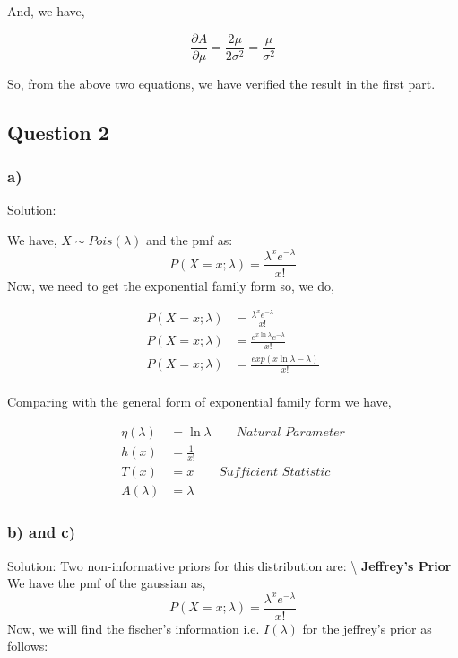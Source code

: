 \documentclass[]{article}
\begin{document}
And, we have,

\begin{equation}
    \frac{\partial A}{\partial \mu} = \frac{2\mu}{2\sigma^2} = \frac{\mu}{\sigma^2}
\end{equation}

So, from the above two equations, we have verified the result in the
first part.

\subsection{Question 2}\label{question-2}

\subsubsection{a)}\label{a-1}

Solution:

We have, \(X \sim Pois (\lambda)\) and the pmf as:
\[P(X = x; \lambda) = \frac{\lambda^x e^{-\lambda}}{x!}\] Now, we need
to get the exponential family form so, we do,

\begin{align}
    P(X = x; \lambda) &= \frac{\lambda^x e^{-\lambda}}{x!} \\
    P(X = x; \lambda) &= \frac{e^{x\ln \lambda} e^{-\lambda}}{x!} \\
    P(X = x; \lambda) &= \frac{exp(x\ln \lambda -\lambda)}{x!} \\
\end{align}

Comparing with the general form of exponential family form we have,

\begin{align*}
    \eta(\lambda) &= \ln \lambda \qquad \textit{Natural Parameter}\\
    h(x) &= \frac{1}{x!}\\
    T(x) &= x \qquad \textit{Sufficient Statistic}\\
    A(\lambda) &= \lambda 
\end{align*}

\subsubsection{b) and c)}\label{b-and-c}

Solution: Two non-informative priors for this distribution are:
\textbackslash{} \textbf{Jeffrey's Prior} We have the pmf of the
gaussian as, \[P(X = x; \lambda) = \frac{\lambda^x e^{-\lambda}}{x!}\]
Now, we will find the fischer's information i.e. \(I(\lambda)\) for the
jeffrey's prior as follows:
\end{document}
